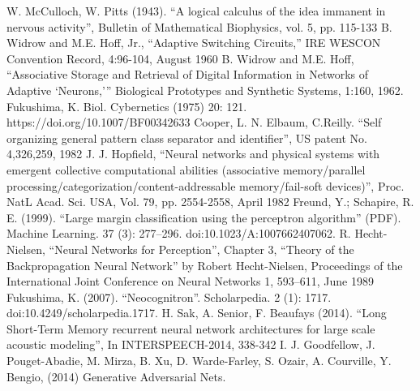 \documentclass[conference]{IEEEtran}
\begin{document}
\begin{thebibliography}{00}

 W. McCulloch, W. Pitts (1943). ``A logical calculus of the idea immanent in nervous activity'', Bulletin of Mathematical Biophysics, vol. 5, pp. 115-133
 B. Widrow and M.E. Hoff, Jr., ``Adaptive Switching Circuits,'' IRE WESCON Convention Record, 4:96-104, August 1960
 B. Widrow and M.E. Hoff, ``Associative Storage and Retrieval of Digital Information in Networks of Adaptive `Neurons,''' Biological Prototypes and Synthetic Systems, 1:160, 1962.
 Fukushima, K. Biol. Cybernetics (1975) 20: 121. https://doi.org/10.1007/BF00342633
 Cooper, L. N. Elbaum, C.Reilly. ``Self organizing general pattern class separator and identifier'', US patent No. 4,326,259, 1982
 J. J. Hopfield, ``Neural networks and physical systems with emergent collective computational abilities (associative memory/parallel processing/categorization/content-addressable memory/fail-soft devices)'', Proc. NatL Acad. Sci. USA, Vol. 79, pp. 2554-2558, April 1982
Freund, Y.; Schapire, R. E. (1999). ``Large margin classification using the perceptron algorithm'' (PDF). Machine Learning. 37 (3): 277–296. doi:10.1023/A:1007662407062.
 R. Hecht-Nielsen, ``Neural Networks for Perception'', Chapter 3, ``Theory of the Backpropagation Neural Network'' by Robert Hecht-Nielsen, Proceedings of the International Joint Conference on Neural Networks 1, 593–611, June 1989
 Fukushima, K. (2007). ``Neocognitron''. Scholarpedia. 2 (1): 1717. doi:10.4249/scholarpedia.1717.
 H. Sak, A. Senior, F. Beaufays (2014). ``Long Short-Term Memory recurrent neural network architectures for large scale acoustic modeling'', In INTERSPEECH-2014, 338-342
 I. J. Goodfellow, J. Pouget-Abadie, M. Mirza, B. Xu, D. Warde-Farley, S. Ozair, A. Courville, Y. Bengio, (2014) Generative Adversarial Nets.


\end{thebibliography}
\vspace{12pt}
\end{document}
